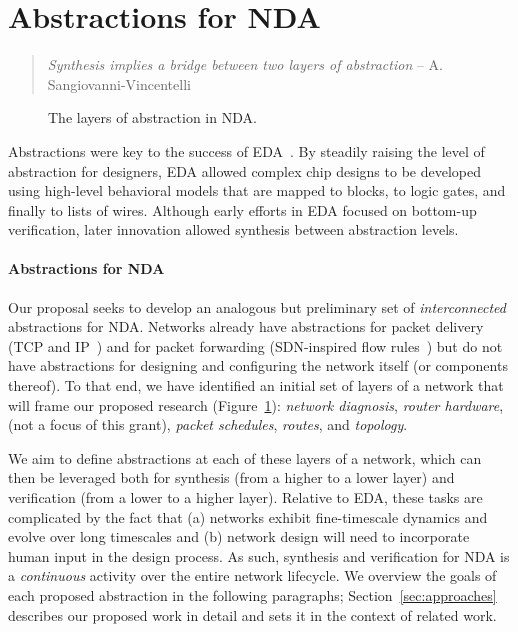 \section{Abstractions for NDA}
\label{sec:abstractions}

\begin{quote}
{\em Synthesis implies a bridge between two layers of abstraction} -- A. Sangiovanni-Vincentelli~\cite{alberto}
\vspace{-2mm}
\end{quote}

\begin{figure}[t]
\centerline{
}
\caption{\label{fig:abstractions} The layers of abstraction in NDA.}
\vspace{-5mm}
\end{figure}

Abstractions were key to the success of EDA~\cite{malik}. By steadily
raising the level of abstraction for designers, EDA allowed complex
chip designs to be developed using high-level behavioral models that
are mapped to blocks, to logic gates, and finally to lists of
wires. Although early efforts in EDA focused on bottom-up
verification, later innovation allowed synthesis between abstraction
levels.

\paragraph*{Abstractions for NDA}
%
Our proposal seeks to develop an analogous but preliminary set of \emph{interconnected} abstractions for NDA. Networks already have
abstractions for packet delivery (TCP and IP~\cite{kurose}) and for
packet forwarding (SDN-inspired flow
rules~\cite{Ethane,4DControlPlane,shenker-abstractions}) but do not have abstractions for
designing and configuring the network itself (or components
thereof). To that end, we have identified an initial set of layers of
a network that will frame our proposed research
(Figure~\ref{fig:abstractions}): {\em network diagnosis}, {\em router hardware}, (not a focus of this grant),  {\em packet schedules}, {\em routes}, and {\em topology}.


We aim to define abstractions at each of these layers of a network,
which can then be leveraged both for synthesis (from a higher to a
lower layer) and verification (from a lower to a higher layer).
Relative to EDA, these tasks are complicated by the fact that (a)
networks exhibit fine-timescale dynamics and evolve over long
timescales and (b) network design will need to incorporate human input
in the design process. As such, synthesis and verification for NDA is
a \emph{continuous} activity over the entire network lifecycle.  We
overview the goals of each proposed abstraction in the following
paragraphs; Section~\ref{sec:approaches} describes our proposed work
in detail and sets it in the context of related work.


